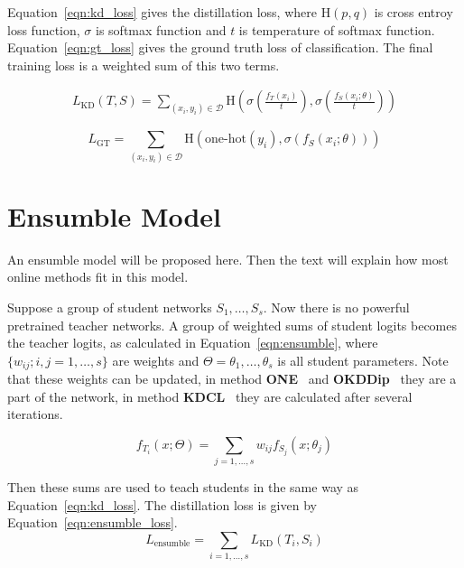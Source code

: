 \documentclass[10pt,twocolumn,letterpaper]{article}
\begin{document}
Equation~\eqref{eqn:kd_loss} gives the distillation loss, where $\textrm{H}(p, q)$ is cross entroy loss function, $\sigma$ is softmax function and $t$ is temperature of softmax function. Equation~\eqref{eqn:gt_loss} gives the
ground truth loss of classification. The final training loss is a weighted sum of this two terms.

\begin{equation}
\label{eqn:kd_loss}
   \begin{split}
   L_{\textrm{KD}}(T, S) = \sum\limits_{(x_i, y_i)\in \mathcal D}{\textrm{H}(\sigma(\frac{f_T(x_i)}{t}), \sigma(\frac{f_S(x_i; \theta)}{t}))}
   \end{split}
\end{equation}

\begin{equation}
\label{eqn:gt_loss}
L_{\textrm{GT}}=\sum\limits_{(x_i, y_i)\in \mathcal D}{\textrm{H}(\textrm{one-hot}(y_i),\sigma(f_S(x_i; \theta)))}
\end{equation}

\section{Ensumble Model}\label{ensubmle_model}
An ensumble model will be proposed here.
Then the text will explain how most online methods fit in this model.

Suppose a group of student networks $S_1,\dots, S_s$.
Now there is no powerful pretrained teacher networks.
A group of weighted sums of student logits becomes the teacher logits,
as calculated in Equation~\eqref{eqn:ensumble}, where
$\{w_{ij}; i, j=1,\dots,s\}$ are weights and $\Theta={\theta_1,\dots,\theta_s}$ is all student parameters. Note that these weights
can be updated, in method \textbf{ONE}~\cite{lan2018knowledge} and \textbf{OKDDip}~\cite{chen2020online}
they are a part of the network, in method \textbf{KDCL}~\cite{guo2020online} they are calculated after several iterations.

\begin{equation}
\label{eqn:ensumble}
f_{T_i}(x; \Theta) = \sum\limits_{j=1,\dots,s}{w_{ij} f_{S_j}(x; \theta_j)}
\end{equation}

Then these sums are used to teach students in the same way as Equation~\eqref{eqn:kd_loss}. The distillation loss is given by Equation~\eqref{eqn:ensumble_loss}.
\begin{equation}
\label{eqn:ensumble_loss}
L_{\textrm{ensumble}}=\sum\limits_{i=1,\dots,s}{L_{\textrm{KD}}(T_i, S_i)}
\end{equation}
\end{document}
